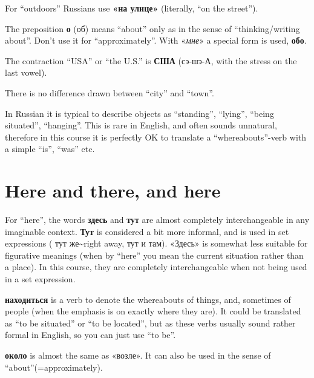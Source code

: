 For ``outdoors'' Russians use \textbf{«на улице»} (literally, ``on the
street'').

The preposition \textbf{о} (об) means ``about'' only as in the sense of
``thinking/writing about''. Don't use it for ``approximately''. With
«\emph{мне}» a special form is used, \textbf{обо}.

The contraction ``USA'' or ``the U.S.'' is \textbf{США} (сэ-шэ-А, with
the stress on the last vowel).

There is no difference drawn between ``city'' and ``town''.

In Russian it is typical to describe objects as ``standing'', ``lying'',
``being situated'', ``hanging''. This is rare in English, and often
sounds unnatural, therefore in this course it is perfectly OK to
translate a ``whereabouts''-verb with a simple ``is'', ``was'' etc.

\section{Here and there, and here}\label{here-and-there-and-here}

For ``here'', the words \textbf{здесь} and \textbf{тут} are almost
completely interchangeable in any imaginable context. \textbf{Тут} is
considered a bit more informal, and is used in set expressions ( тут
же\textasciitilde{}right away, тут и там). «Здесь» is somewhat less
suitable for figurative meanings (when by ``here'' you mean the current
situation rather than a place). In this course, they are completely
interchangeable when not being used in a set expression.

\textbf{находиться} is a verb to denote the whereabouts of things, and,
sometimes of people (when the emphasis is on exactly where they are). It
could be translated as ``to be situated'' or ``to be located'', but as
these verbs usually sound rather formal in English, so you can just use
``to be''.

\textbf{около} is almost the same as «возле». It can also be used in the
sense of ``about''(=approximately).
